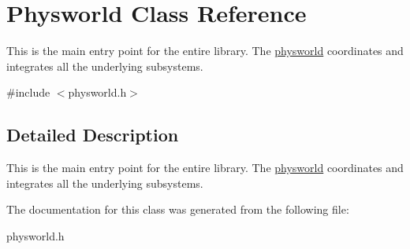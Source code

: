\hypertarget{classPhysworld}{
\section{Physworld Class Reference}
\label{d9/dc3/classPhysworld}
}


This is the main entry point for the entire library. The \hyperlink{classphysworld}{physworld} coordinates and integrates all the underlying subsystems.  


{\ttfamily \#include $<$physworld.h$>$}

\subsection{Detailed Description}
This is the main entry point for the entire library. The \hyperlink{classphysworld}{physworld} coordinates and integrates all the underlying subsystems. 

The documentation for this class was generated from the following file:\begin{DoxyCompactItemize}
\item 
physworld.h\end{DoxyCompactItemize}
